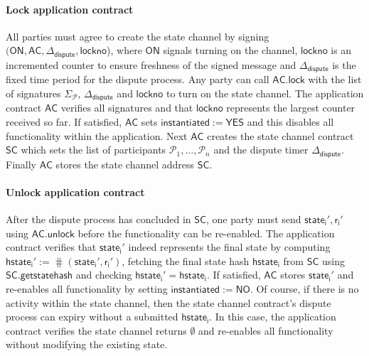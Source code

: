 \documentclass{llncs}
\newcommand{\instantiated}{\mathsf{instantiated}}
\newcommand{\instantiatedno}{\mathsf{NO}}
\newcommand{\instantiatedyes}{\mathsf{YES}}
\newcommand{\chanon}{\mathsf{ON}}
\newcommand{\hstatei}{\mathsf{hstate}_{\monotoniccounter}}
\newcommand{\monotoniccounter}{\mathsf{i}}
\newcommand{\stateinfoi}{\mathsf{state}_{\mathsf{i}}}
\newcommand{\participant}{\mathcal{P}}
\newcommand{\rani}{\mathsf{r}_{\mathsf{i}}}
\newcommand{\statechannel}{\mathsf{SC}}
\newcommand{\statechannelgetcommitment}{\mathsf{SC}.\mathsf{getstatehash}}
\newcommand{\appcontract}{\mathsf{AC}}
\newcommand{\applock}{\mathsf{AC.lock}}
\newcommand{\appunlock}{\mathsf{AC.unlock}}
\newcommand{\timerdispute}{\mathsf{\Delta}_{\mathsf{dispute}}}
\begin{document}
 
\paragraph{Lock application contract} All parties must agree to create the state channel by signing $(\chanon, \appcontract, \timerdispute, \mathsf{lockno}$), where $\chanon$ signals turning on the channel, $\mathsf{lockno}$ is an incremented counter to ensure freshness of the signed message and $\timerdispute$ is the fixed time period for the dispute process. 
Any party can call $\applock$ with the list of signatures $\Sigma_{\participant}$, $\timerdispute$ and $\mathsf{lockno}$ to turn on the state channel. 
The application contract $\appcontract$ verifies all signatures and that $\mathsf{lockno}$ represents the largest counter received so far.
If satisfied, $\appcontract$ sets  $\instantiated := \instantiatedyes$ and this disables all functionality within the application.
Next $\appcontract$ creates the state channel contract $\statechannel$ which sets the list of participants $\participant_{1},...,\participant_{n}$ and the dispute timer $\timerdispute$. 
Finally $\appcontract$ stores the state channel address $\statechannel$. 
 

\paragraph{Unlock application contract}

After the dispute process has concluded in $\statechannel$, one party must send  $\stateinfoi',\rani'$ using $\appunlock$ before the functionality can be re-enabled.
The application contract verifies that $\stateinfoi'$  indeed represents the final state by computing $\hstatei' := \hash(\stateinfoi', \rani')$, fetching the final state hash $\hstatei$ from $\statechannel$ using $\statechannelgetcommitment$ and checking  $\hstatei' = \hstatei$. 
If satisfied, $\appcontract$ stores $\stateinfoi'$ and re-enables all functionality by setting $\instantiated :=  \instantiatedno$. 
Of course, if there is no activity within the state channel, then the state channel contract's dispute process can expiry without a submitted $\hstatei$.
In this case, the application contract verifies the state channel returns $\emptyset$ and re-enables all functionality without modifying the existing state. 


\end{document}

